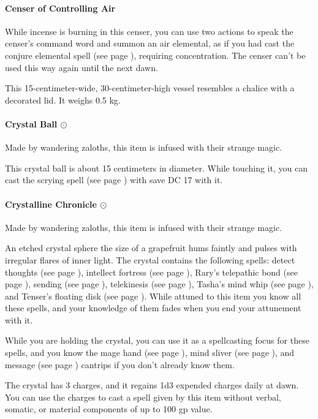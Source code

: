 \paragraph{Censer of Controlling Air}
    While incense is burning in this censer, you can use two actions to speak the censer's command word and summon an air elemental, as if you had cast the conjure elemental spell (see page \pageref{spell::conjureelemental}), requiring concentration.
    The censer can't be used this way again until the next dawn.

    This 15-centimeter-wide, 30-centimeter-high vessel resembles a chalice with a decorated lid.
    It weighs 0.5 kg.
\paragraph{Crystal Ball $\odot$}
    Made by wandering zaloths, this item is infused with their strange magic.

    This crystal ball is about 15 centimeters in diameter.
    While touching it, you can cast the scrying spell (see page \pageref{spell::scrying}) with save DC 17 with it.
\paragraph{Crystalline Chronicle $\odot$}
    Made by wandering zaloths, this item is infused with their strange magic.

    An etched crystal sphere the size of a grapefruit hums faintly and pulses with irregular flares of inner light.
    The crystal contains the following spells: detect thoughts (see page \pageref{spell::detectthoughts}), intellect fortress (see page \pageref{spell::intellectfortress}), Rary's telepathic bond (see page \pageref{spell::rarystelepathicbond}), sending (see page \pageref{spell::sending}), telekinesis (see page \pageref{spell::telekinesis}), Tasha's mind whip (see page \pageref{spell::tashasmindwhip}), and Tenser's floating disk (see page \pageref{spell::tensersfloatingdisc}).
    While attuned to this item you know all these spells, and your knowledge of them fades when you end your attunement with it.

    While you are holding the crystal, you can use it as a spellcasting focus for these spells, and you know the mage hand (see page \pageref{spell::magehand}), mind sliver (see page \pageref{spell::mindsliver}), and message (see page \pageref{spell::message}) cantrips if you don't already know them.

    The crystal has 3 charges, and it regains 1d3 expended charges daily at dawn.
    You can use the charges to cast a spell given by this item without verbal, somatic, or material components of up to 100 gp value.
